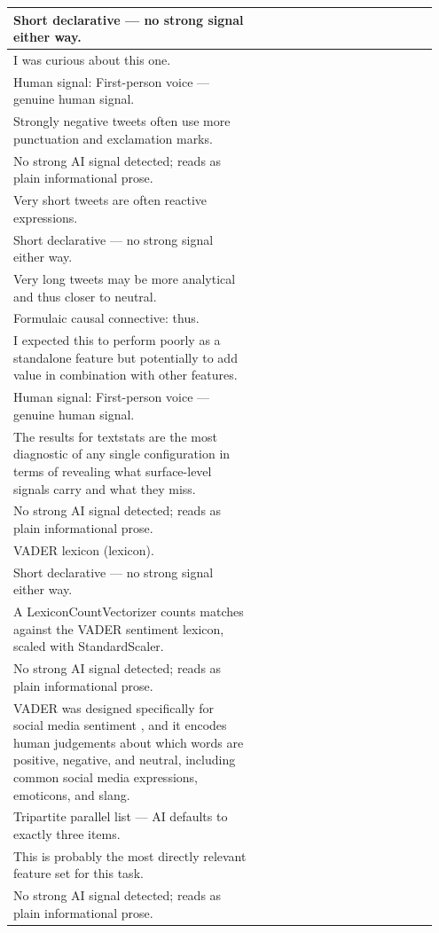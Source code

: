 \documentclass[11pt]{article}
\begin{document}
\begin{longtable}{|p{0.55\linewidth}|p{0.40\linewidth}|}
\hline
Short declarative --- no strong signal either way. & \\
\hline
I was curious about this one. & \\[2pt]
\hline
Human signal: First-person voice --- genuine human signal. & \\
\hline
Strongly negative tweets often use more punctuation and exclamation marks. & \\[2pt]
\hline
No strong AI signal detected; reads as plain informational prose. & \\
\hline
Very short tweets are often reactive expressions. & \\[2pt]
\hline
Short declarative --- no strong signal either way. & \\
\hline
Very long tweets may be more analytical and thus closer to neutral. & \\[2pt]
\hline
Formulaic causal connective: thus. & \\
\hline
I expected this to perform poorly as a standalone feature but potentially to add value in combination with other features. & \\[2pt]
\hline
Human signal: First-person voice --- genuine human signal. & \\
\hline
The results for textstats are the most diagnostic of any single configuration in terms of revealing what surface-level signals carry and what they miss. & \\[2pt]
\hline
No strong AI signal detected; reads as plain informational prose. & \\
\hline
VADER lexicon (lexicon). & \\[2pt]
\hline
Short declarative --- no strong signal either way. & \\
\hline
A LexiconCountVectorizer counts matches against the VADER sentiment lexicon, scaled with StandardScaler. & \\[2pt]
\hline
No strong AI signal detected; reads as plain informational prose. & \\
\hline
VADER was designed specifically for social media sentiment , and it encodes human judgements about which words are positive, negative, and neutral, including common social media expressions, emoticons, and slang. & \\[2pt]
\hline
Tripartite parallel list --- AI defaults to exactly three items. & \\
\hline
This is probably the most directly relevant feature set for this task. & \\[2pt]
\hline
No strong AI signal detected; reads as plain informational prose. & \\

\end{longtable}
\end{document}

